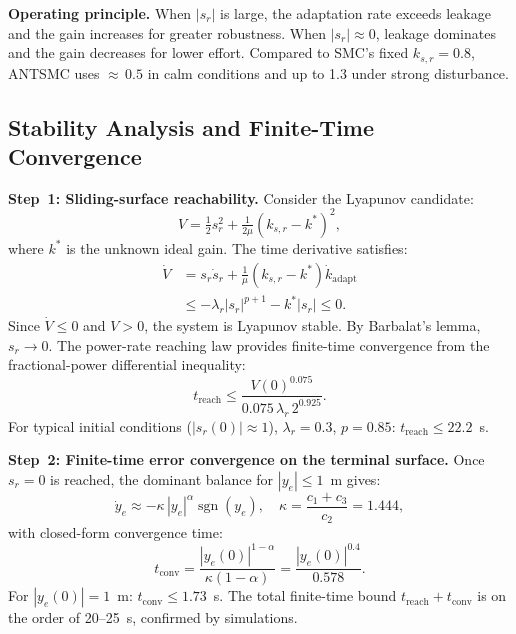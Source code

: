\documentclass[review]{cas-dc}
\begin{document}
\textbf{Operating principle.} When $|s_r|$ is large, the adaptation rate exceeds leakage and the gain increases for greater robustness. When $|s_r| \approx 0$, leakage dominates and the gain decreases for lower effort. Compared to SMC's fixed $k_{s,r} = 0.8$, ANTSMC uses ${\approx}\,0.5$ in calm conditions and up to 1.3 under strong disturbance.


\subsection{Stability Analysis and Finite-Time Convergence}
\label{sec:stability}

\textbf{Step~1: Sliding-surface reachability.} Consider the Lyapunov candidate:
\begin{equation}
V = \tfrac{1}{2}s_r^2 + \tfrac{1}{2\mu}(k_{s,r} - k^*)^2,
\label{eq:lyapunov}
\end{equation}
where $k^*$ is the unknown ideal gain. The time derivative satisfies:
\begin{align}
\dot{V} &= s_r\dot{s}_r + \tfrac{1}{\mu}(k_{s,r} - k^*)\dot{k}_{\mathrm{adapt}} \label{eq:Vdot1}\\
&\leq -\lambda_r |s_r|^{p+1} - k^*|s_r| \leq 0. \label{eq:Vdot2}
\end{align}
Since $\dot{V} \leq 0$ and $V > 0$, the system is Lyapunov stable. By Barbalat's lemma, $s_r \to 0$. The power-rate reaching law provides finite-time convergence from the fractional-power differential inequality:
\begin{equation}
t_{\mathrm{reach}} \leq \frac{V(0)^{0.075}}{0.075\,\lambda_r\, 2^{0.925}}.
\label{eq:treach}
\end{equation}
For typical initial conditions ($|s_r(0)| \approx 1$), $\lambda_r = 0.3$, $p = 0.85$: $t_{\mathrm{reach}} \leq 22.2$~s.

\textbf{Step~2: Finite-time error convergence on the terminal surface.} Once $s_r = 0$ is reached, the dominant balance for $|y_e| \leq 1$~m gives:
\begin{equation}
\dot{y}_e \approx -\kappa\,|y_e|^\alpha \operatorname{sgn}(y_e), \quad \kappa = \frac{c_1 + c_3}{c_2} = 1.444,
\label{eq:ye_ode}
\end{equation}
with closed-form convergence time:
\begin{equation}
t_{\mathrm{conv}} = \frac{|y_e(0)|^{1-\alpha}}{\kappa(1-\alpha)} = \frac{|y_e(0)|^{0.4}}{0.578}.
\label{eq:tconv}
\end{equation}
For $|y_e(0)| = 1$~m: $t_{\mathrm{conv}} \leq 1.73$~s. The total finite-time bound $t_{\mathrm{reach}} + t_{\mathrm{conv}}$ is on the order of 20--25~s, confirmed by simulations.
\end{document}
